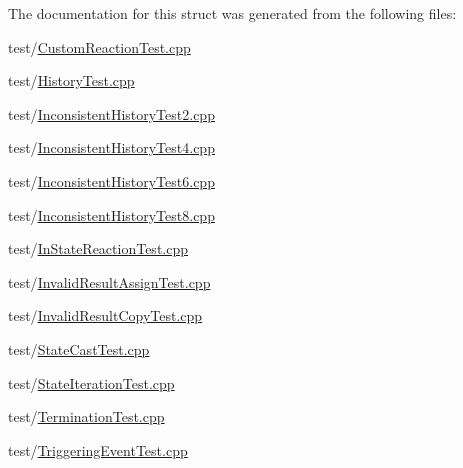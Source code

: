 The documentation for this struct was generated from the following files\+:\begin{DoxyCompactItemize}
\item 
test/\mbox{\hyperlink{_custom_reaction_test_8cpp}{Custom\+Reaction\+Test.\+cpp}}\item 
test/\mbox{\hyperlink{_history_test_8cpp}{History\+Test.\+cpp}}\item 
test/\mbox{\hyperlink{_inconsistent_history_test2_8cpp}{Inconsistent\+History\+Test2.\+cpp}}\item 
test/\mbox{\hyperlink{_inconsistent_history_test4_8cpp}{Inconsistent\+History\+Test4.\+cpp}}\item 
test/\mbox{\hyperlink{_inconsistent_history_test6_8cpp}{Inconsistent\+History\+Test6.\+cpp}}\item 
test/\mbox{\hyperlink{_inconsistent_history_test8_8cpp}{Inconsistent\+History\+Test8.\+cpp}}\item 
test/\mbox{\hyperlink{_in_state_reaction_test_8cpp}{In\+State\+Reaction\+Test.\+cpp}}\item 
test/\mbox{\hyperlink{_invalid_result_assign_test_8cpp}{Invalid\+Result\+Assign\+Test.\+cpp}}\item 
test/\mbox{\hyperlink{_invalid_result_copy_test_8cpp}{Invalid\+Result\+Copy\+Test.\+cpp}}\item 
test/\mbox{\hyperlink{_state_cast_test_8cpp}{State\+Cast\+Test.\+cpp}}\item 
test/\mbox{\hyperlink{_state_iteration_test_8cpp}{State\+Iteration\+Test.\+cpp}}\item 
test/\mbox{\hyperlink{_termination_test_8cpp}{Termination\+Test.\+cpp}}\item 
test/\mbox{\hyperlink{_triggering_event_test_8cpp}{Triggering\+Event\+Test.\+cpp}}\end{DoxyCompactItemize}
